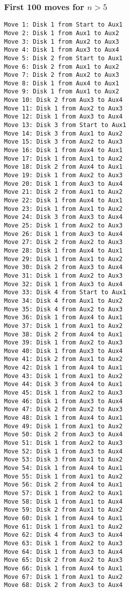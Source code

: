 \documentclass[11pt]{article}
\begin{document}
\begin{multicols}{2}
\subsubsection*{First 100 moves for $n > 5$}

\begin{Verbatim}[fontsize=\small]
Move 1: Disk 1 from Start to Aux1
Move 2: Disk 1 from Aux1 to Aux2
Move 3: Disk 1 from Aux2 to Aux3
Move 4: Disk 1 from Aux3 to Aux4
Move 5: Disk 2 from Start to Aux1
Move 6: Disk 2 from Aux1 to Aux2
Move 7: Disk 2 from Aux2 to Aux3
Move 8: Disk 1 from Aux4 to Aux1
Move 9: Disk 1 from Aux1 to Aux2
Move 10: Disk 2 from Aux3 to Aux4
Move 11: Disk 1 from Aux2 to Aux3
Move 12: Disk 1 from Aux3 to Aux4
Move 13: Disk 3 from Start to Aux1
Move 14: Disk 3 from Aux1 to Aux2
Move 15: Disk 3 from Aux2 to Aux3
Move 16: Disk 1 from Aux4 to Aux1
Move 17: Disk 1 from Aux1 to Aux2
Move 18: Disk 2 from Aux4 to Aux1
Move 19: Disk 1 from Aux2 to Aux3
Move 20: Disk 1 from Aux3 to Aux4
Move 21: Disk 2 from Aux1 to Aux2
Move 22: Disk 1 from Aux4 to Aux1
Move 23: Disk 1 from Aux1 to Aux2
Move 24: Disk 3 from Aux3 to Aux4
Move 25: Disk 1 from Aux2 to Aux3
Move 26: Disk 1 from Aux3 to Aux4
Move 27: Disk 2 from Aux2 to Aux3
Move 28: Disk 1 from Aux4 to Aux1
Move 29: Disk 1 from Aux1 to Aux2
Move 30: Disk 2 from Aux3 to Aux4
Move 31: Disk 1 from Aux2 to Aux3
Move 32: Disk 1 from Aux3 to Aux4
Move 33: Disk 4 from Start to Aux1
Move 34: Disk 4 from Aux1 to Aux2
Move 35: Disk 4 from Aux2 to Aux3
Move 36: Disk 1 from Aux4 to Aux1
Move 37: Disk 1 from Aux1 to Aux2
Move 38: Disk 2 from Aux4 to Aux1
Move 39: Disk 1 from Aux2 to Aux3
Move 40: Disk 1 from Aux3 to Aux4
Move 41: Disk 2 from Aux1 to Aux2
Move 42: Disk 1 from Aux4 to Aux1
Move 43: Disk 1 from Aux1 to Aux2
Move 44: Disk 3 from Aux4 to Aux1
Move 45: Disk 1 from Aux2 to Aux3
Move 46: Disk 1 from Aux3 to Aux4
Move 47: Disk 2 from Aux2 to Aux3
Move 48: Disk 1 from Aux4 to Aux1
Move 49: Disk 1 from Aux1 to Aux2
Move 50: Disk 2 from Aux3 to Aux4
Move 51: Disk 1 from Aux2 to Aux3
Move 52: Disk 1 from Aux3 to Aux4
Move 53: Disk 3 from Aux1 to Aux2
Move 54: Disk 1 from Aux4 to Aux1
Move 55: Disk 1 from Aux1 to Aux2
Move 56: Disk 2 from Aux4 to Aux1
Move 57: Disk 1 from Aux2 to Aux1
Move 58: Disk 1 from Aux1 to Aux4
Move 59: Disk 2 from Aux1 to Aux2
Move 60: Disk 1 from Aux4 to Aux1
Move 61: Disk 1 from Aux1 to Aux2
Move 62: Disk 4 from Aux3 to Aux4
Move 63: Disk 1 from Aux2 to Aux3
Move 64: Disk 1 from Aux3 to Aux4
Move 65: Disk 2 from Aux2 to Aux3
Move 66: Disk 1 from Aux4 to Aux1
Move 67: Disk 1 from Aux1 to Aux2
Move 68: Disk 2 from Aux3 to Aux4

\end{Verbatim}
\end{multicols}
\end{document}
